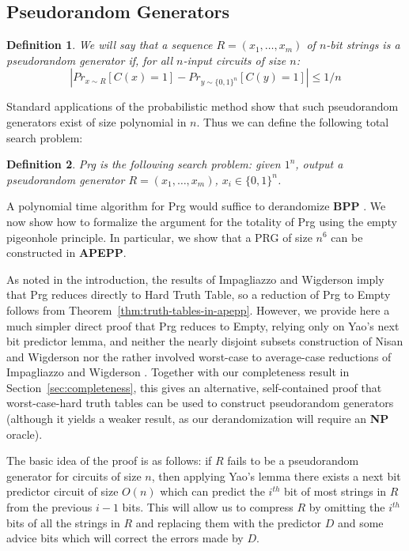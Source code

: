 \documentclass[11pt]{article}
\newtheorem{definition}{Definition}
\def\cl{\bf}
\begin{document}
\subsection{Pseudorandom Generators}
\begin{definition}
We will say that a sequence $R = (x_1, \ldots, x_m)$ of $n$-bit strings is a pseudorandom generator if, for all $n$-input circuits of size $n$:
\[
|Pr_{x \sim R}[C(x)=1] - Pr_{y \sim \{0,1\}^n}[C(y)=1]| \leq 1/n
\]
\end{definition}

Standard applications of the probabilistic method show that such pseudorandom generators exist of size polynomial in $n$. Thus we can define the following total search problem:
\begin{definition}
{\sc Prg} is the following search problem: given $1^n$, output a pseudorandom generator $R = (x_1, \ldots, x_m)$, $x_i \in \{0,1\}^n$.
\end{definition}

A polynomial time algorithm for {\sc Prg} would suffice to derandomize {\cl BPP} \cite{NW}. We now show how to formalize the argument for the totality of {\sc Prg} using the empty pigeonhole principle. In particular, we show that a PRG of size $n^6$ can be constructed in {\cl APEPP}.

As noted in the introduction, the results of Impagliazzo and Wigderson \cite{IW} imply that {\sc Prg} reduces directly to {\sc Hard Truth Table}, so a reduction of {\sc Prg} to {\sc Empty} follows from Theorem~\ref{thm:truth-tables-in-apepp}. However, we provide here a much simpler direct proof that {\sc Prg} reduces to {\sc Empty}, relying only on Yao's next bit predictor lemma, and neither the nearly disjoint subsets construction of Nisan and Wigderson \cite{NW} nor the rather involved worst-case to average-case reductions of Impagliazzo and Wigderson \cite{IW}. Together with our completeness result in Section~\ref{sec:completeness}, this gives an alternative, self-contained proof that worst-case-hard truth tables can be used to construct pseudorandom generators (although it yields a weaker result, as our derandomization will require an {\cl NP} oracle).

The basic idea of the proof is as follows: if $R$ fails to be a pseudorandom generator for circuits of size $n$, then applying Yao's lemma there exists a next bit predictor circuit of size $O(n)$ which can predict the $i^{th}$ bit of most strings in $R$ from the previous $i-1$ bits. This will allow us to compress $R$ by omitting the $i^{th}$ bits of all the strings in $R$ and replacing them with the predictor $D$ and some advice bits which will correct the errors made by $D$.
\end{document}
